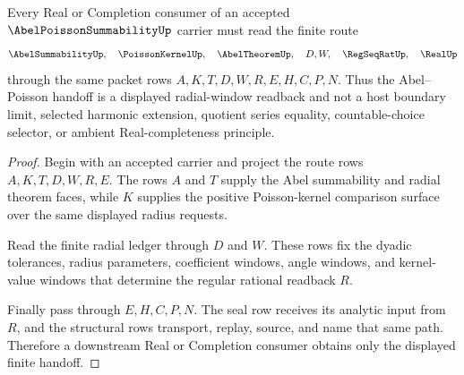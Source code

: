\begin{theorem}
\label{thm:abel-poisson-summability-real-seal-route}
Every Real or Completion consumer of an accepted $\AbelPoissonSummabilityUp$ carrier must read the finite route
$$
\AbelSummabilityUp,\quad \PoissonKernelUp,\quad \AbelTheoremUp,\quad D,W,\quad \RegSeqRatUp,\quad \RealUp
$$
through the same packet rows $A,K,T,D,W,R,E,H,C,P,N$. Thus the Abel--Poisson handoff is a displayed radial-window readback and not a host boundary limit, selected harmonic extension, quotient series equality, countable-choice selector, or ambient Real-completeness principle.
\end{theorem}
\begin{proof}
Begin with an accepted carrier and project the route rows $A,K,T,D,W,R,E$. The rows $A$ and $T$ supply the Abel summability and radial theorem faces, while $K$ supplies the positive Poisson-kernel comparison surface over the same displayed radius requests.

Read the finite radial ledger through $D$ and $W$. These rows fix the dyadic tolerances, radius parameters, coefficient windows, angle windows, and kernel-value windows that determine the regular rational readback $R$.

Finally pass through $E,H,C,P,N$. The seal row receives its analytic input from $R$, and the structural rows transport, replay, source, and name that same path. Therefore a downstream Real or Completion consumer obtains only the displayed finite handoff.
\end{proof}




